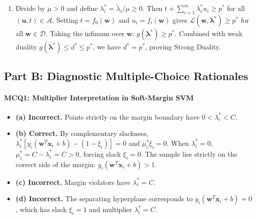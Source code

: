 \begin{enumerate}[label=(\alph*)]
    This is a direct contradiction! Thus $\mu > 0$.
    \item Divide by $\mu > 0$ and define $\lambda_i^* = \tilde{\lambda}_i / \mu \ge 0$.
    Then $t + \sum_{i=1}^m \lambda_i^* u_i \ge p^*$ for all $(\mathbf{u}, t) \in \mathcal{A}$.
    Setting $t = f_0(\mathbf{w})$ and $u_i = f_i(\mathbf{w})$ gives $\mathcal{L}(\mathbf{w}, \boldsymbol{\lambda}^*) \ge p^*$ for all $\mathbf{w} \in \mathcal{D}$.
    Taking the infimum over $\mathbf{w}$: $g(\boldsymbol{\lambda}^*) \ge p^*$.
    Combined with weak duality $g(\boldsymbol{\lambda}^*) \le d^* \le p^*$, we have $d^* = p^*$, proving Strong Duality.
\end{enumerate}

\subsection*{Part B: Diagnostic Multiple-Choice Rationales}

\paragraph{MCQ1: Multiplier Interpretation in Soft-Margin SVM}
\begin{itemize}
    \item \textbf{(a) Incorrect.} Points strictly on the margin boundary have $0 < \lambda_i^* < C$.
    \item \textbf{(b) Correct.} By complementary slackness, $\lambda_i^* [y_i(\mathbf{w}^T \mathbf{x}_i + b) - (1 - \xi_i)] = 0$ and $\mu_i^* \xi_i = 0$. When $\lambda_i^* = 0$, $\mu_i^* = C - \lambda_i^* = C > 0$, forcing slack $\xi_i = 0$. The sample lies strictly on the correct side of the margin: $y_i(\mathbf{w}^T \mathbf{x}_i + b) > 1$.
    \item \textbf{(c) Incorrect.} Margin violators have $\lambda_i^* = C$.
    \item \textbf{(d) Incorrect.} The separating hyperplane corresponds to $y_i(\mathbf{w}^T \mathbf{x}_i + b) = 0$, which has slack $\xi_i = 1$ and multiplier $\lambda_i^* = C$.
\end{itemize}

